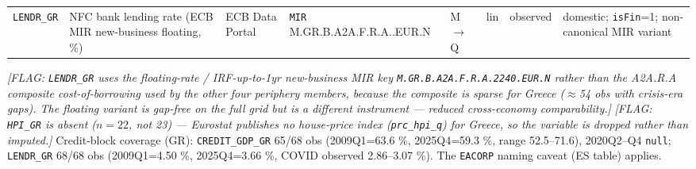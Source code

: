 \begin{longtable}{@{}p{}p{}p{}p{}p{}p{}p{}p{}@{}}
\texttt{LENDR\_GR} & NFC bank lending rate (ECB MIR new-business floating, \%) & ECB Data Portal & \texttt{MIR} M.\allowbreak GR.\allowbreak B.\allowbreak A2A.\allowbreak F.\allowbreak R.\allowbreak A.\allowbreak 2240.\allowbreak EUR.\allowbreak N & M$\to$Q & lin & observed & domestic; \texttt{isFin}=1; non-canonical MIR variant \\
\end{longtable}

\noindent\textit{[FLAG: \texttt{LENDR\_GR} uses the floating-rate / IRF-up-to-1yr
new-business MIR key \texttt{M.\allowbreak GR.\allowbreak B.\allowbreak A2A.\allowbreak F.\allowbreak R.\allowbreak A.2240.\allowbreak EUR.\allowbreak N} rather than the A2A.R.A
composite cost-of-borrowing used by the other four periphery members, because
the composite is sparse for Greece ($\approx$54 obs with crisis-era gaps). The
floating variant is gap-free on the full grid but is a different instrument ---
reduced cross-economy comparability.]}
\textit{[FLAG: \texttt{HPI\_GR} is absent ($n=22$, not 23) --- Eurostat publishes
no house-price index (\texttt{prc\_hpi\_q}) for Greece, so the variable is
dropped rather than imputed.]}
Credit-block coverage (GR): \texttt{CREDIT\_GDP\_GR} 65/68 obs (2009Q1=63.6 \%,
2025Q4=59.3 \%, range 52.5--71.6), 2020Q2--Q4 \texttt{null}; \texttt{LENDR\_GR}
68/68 obs (2009Q1=4.50 \%, 2025Q4=3.66 \%, COVID observed 2.86--3.07 \%). The
\texttt{EACORP} naming caveat (ES table) applies.


